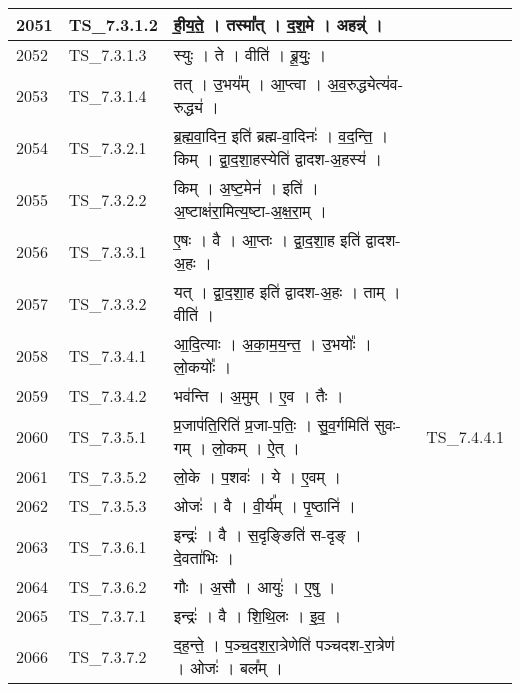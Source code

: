 \documentclass[17pt]{extarticle}
\begin{document}
\begin{longtable}{||p{0.4in}||p{0.9in}||p{4.0in}||p{0.9in}||}
        \hline
            2051 & TS\_7.3.1.2 & ही॒य॒ते॒   ।   तस्मा᳚त्   ।   द॒श॒मे   ।   अहन्न्॑   ।    &      \\
        \hline
            2052 & TS\_7.3.1.3 & स्युः   ।   ते   ।   वीति॑   ।   ब्रू॒युः॒   ।    &      \\
        \hline
            2053 & TS\_7.3.1.4 & तत्   ।   उ॒भय᳚म्   ।   आ॒प्त्वा   ।   अ॒व॒रुद्ध्येत्य॑व{-}रुद्ध्य॑   ।    &      \\
        \hline
            2054 & TS\_7.3.2.1 & ब्र॒ह्म॒वा॒दिन॒ इति॑ ब्रह्म{-}वा॒दिनः॑   ।   व॒द॒न्ति॒   ।   किम्   ।   द्वा॒द॒शा॒हस्येति॑ द्वादश{-}अ॒हस्य॑   ।    &      \\
        \hline
            2055 & TS\_7.3.2.2 & किम्   ।   अ॒ष्ट॒मेन॑   ।   इति॑   ।   अ॒ष्टाक्ष॑रा॒मित्य॒ष्टा{-}अ॒क्ष॒रा॒म्   ।    &      \\
        \hline
            2056 & TS\_7.3.3.1 & ए॒षः   ।   वै   ।   आ॒प्तः   ।   द्वा॒द॒शा॒ह इति॑ द्वादश{-}अ॒हः   ।    &      \\
        \hline
            2057 & TS\_7.3.3.2 & यत्   ।   द्वा॒द॒शा॒ह इति॑ द्वादश{-}अ॒हः   ।   ताम्   ।   वीति॑   ।    &      \\
        \hline
            2058 & TS\_7.3.4.1 & आ॒दि॒त्याः   ।   अ॒का॒म॒य॒न्त॒   ।   उ॒भयोः᳚   ।   लो॒कयोः᳚   ।    &      \\
        \hline
            2059 & TS\_7.3.4.2 & भव॑न्ति   ।   अ॒मुम्   ।   ए॒व   ।   तैः   ।    &      \\
        \hline
            2060 & TS\_7.3.5.1 & प्र॒जाप॑ति॒रिति॑ प्र॒जा{-}प॒तिः॒   ।   सु॒व॒र्गमिति॑ सुवः{-}गम्   ।   लो॒कम्   ।   ऐ॒त्   ।    &  TS\_7.4.4.1       \\
        \hline
            2061 & TS\_7.3.5.2 & लो॒के   ।   प॒शवः॑   ।   ये   ।   ए॒वम्   ।    &      \\
        \hline
            2062 & TS\_7.3.5.3 & ओजः॑   ।   वै   ।   वी॒र्य᳚म्   ।   पृ॒ष्ठानि॑   ।    &      \\
        \hline
            2063 & TS\_7.3.6.1 & इन्द्रः॑   ।   वै   ।   स॒दृङ्ङिति॑ स{-}दृङ्   ।   दे॒वता॑भिः   ।    &      \\
        \hline
            2064 & TS\_7.3.6.2 & गौः   ।   अ॒सौ   ।   आयुः॑   ।   ए॒षु   ।    &      \\
        \hline
            2065 & TS\_7.3.7.1 & इन्द्रः॑   ।   वै   ।   शि॒थि॒लः   ।   इ॒व॒   ।    &      \\
        \hline
            2066 & TS\_7.3.7.2 & द॒ह॒न्ते॒   ।   प॒ञ्च॒द॒श॒रा॒त्रेणेति॑ पञ्चदश{-}रा॒त्रेण॑   ।   ओजः॑   ।   बल᳚म्   ।    &      \\

\end{longtable}
\end{document}
